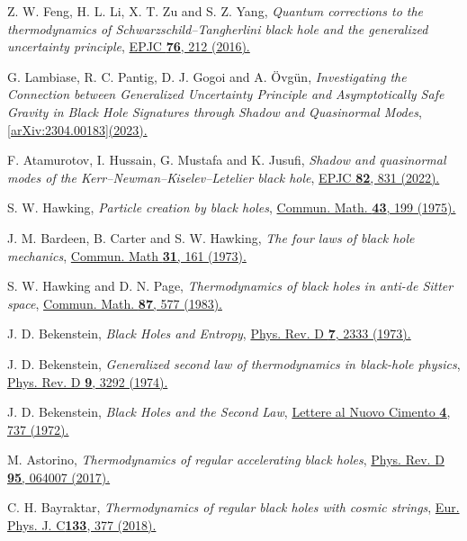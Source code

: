 \documentclass[aps,amsmath,amssymb,showpacs,showkeys]{revtex4}
\begin{document}
\begin{thebibliography}{99}
Z. W. Feng, H. L. Li, X. T. Zu and S. Z. Yang, \textit{Quantum corrections to the thermodynamics of Schwarzschild–Tangherlini black hole and the generalized uncertainty principle}, \href{https://link.springer.com/article/10.1140/epjc/s10052-016-4057-1#citeas}{EPJC \textbf{76}, 212 (2016).}

G. Lambiase, R. C. Pantig, D. J. Gogoi and A. \"{O}vg\"{u}n, \textit{Investigating the Connection between Generalized Uncertainty Principle and Asymptotically Safe Gravity in Black Hole Signatures through Shadow and Quasinormal Modes}, \href{https://arxiv.org/abs/2304.00183}{[arXiv:2304.00183](2023).}


F. Atamurotov, I. Hussain, G. Mustafa and K. Jusufi, \textit{Shadow and quasinormal modes of the Kerr–Newman–Kiselev–Letelier black hole}, \href{https://link.springer.com/article/10.1140/epjc/s10052-022-10782-3}{EPJC \textbf{82}, 831 (2022).}



S. W. Hawking, \textit{Particle creation by black holes}, \href{https://doi.org/10.1007/BF02345020}{Commun. Math. \textbf{43}, 199 (1975).}

J. M. Bardeen, B. Carter and S. W. Hawking, \textit{The four laws of black hole mechanics}, \href{https://doi.org/10.1007/BF01645742}{Commun. Math \textbf{31}, 161 (1973).}

S. W. Hawking and D. N. Page, \textit{Thermodynamics of black holes in anti-de Sitter space}, \href{https://doi.org/10.1007/BF01208266}{Commun. Math. \textbf{87}, 577 (1983).}

J. D. Bekenstein, \textit{Black Holes and Entropy}, \href{https://doi.org/10.1103/PhysRevD.7.2333}{Phys. Rev. D \textbf{7}, 2333 (1973).}

J. D. Bekenstein, \textit{Generalized second law of thermodynamics in black-hole physics}, \href{https://doi.org/10.1103/PhysRevD.9.3292}{Phys. Rev. D \textbf{9}, 3292 (1974).}

J. D. Bekenstein, \textit{Black Holes and the Second Law}, \href{https://link.springer.com/article/10.1007/BF02757029}{Lettere al Nuovo Cimento \textbf{4}, 737 (1972).}

M. Astorino, \textit{Thermodynamics of regular accelerating black holes}, \href{https://doi.org/10.1103/PhysRevD.95.064007}{Phys. Rev. D \textbf{95}, 064007 (2017).}

C. H. Bayraktar, \textit{Thermodynamics of regular black holes with cosmic strings}, \href{https://doi.org/10.1140/epjp/i2018-12216-6}{Eur. Phys. J. C\textbf{133}, 377 (2018).}


\end{thebibliography}
\end{document}
